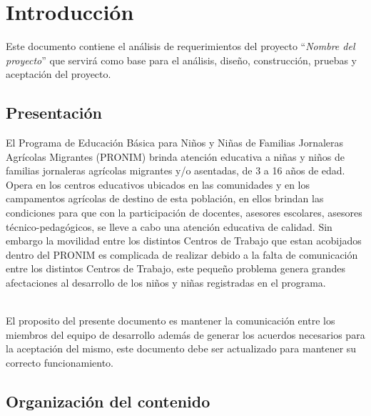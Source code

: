 
\chapter{Introducción}


	Este documento contiene el análisis de requerimientos del proyecto ``{\em Nombre del proyecto}'' que servirá como base para el análisis, diseño, construcción, pruebas y aceptación del proyecto.

\section{Presentación}


El Programa de Educación Básica para Niños y Niñas de Familias Jornaleras Agrícolas Migrantes (PRONIM) brinda atención educativa a niñas y niños de familias jornaleras agrícolas migrantes y/o asentadas, de 3 a 16 años de edad. Opera en los centros educativos ubicados en las comunidades y en los campamentos agrícolas de destino de esta población, en ellos brindan las condiciones para que con la participación de docentes, asesores escolares, asesores técnico-pedagógicos, se lleve a cabo una atención educativa de calidad.
Sin embargo la movilidad entre los distintos Centros de Trabajo que estan acobijados dentro del PRONIM es complicada de realizar debido a la falta de comunicación entre los distintos Centros de Trabajo, este pequeño problema genera grandes afectaciones al desarrollo de los niños y niñas registradas en el programa.

\\
El proposito del presente documento es mantener la comunicación entre los miembros del equipo de desarrollo además de generar los acuerdos necesarios para la aceptación del mismo, este documento debe ser actualizado para mantener su correcto funcionamiento. 
\section{Organización del contenido}

